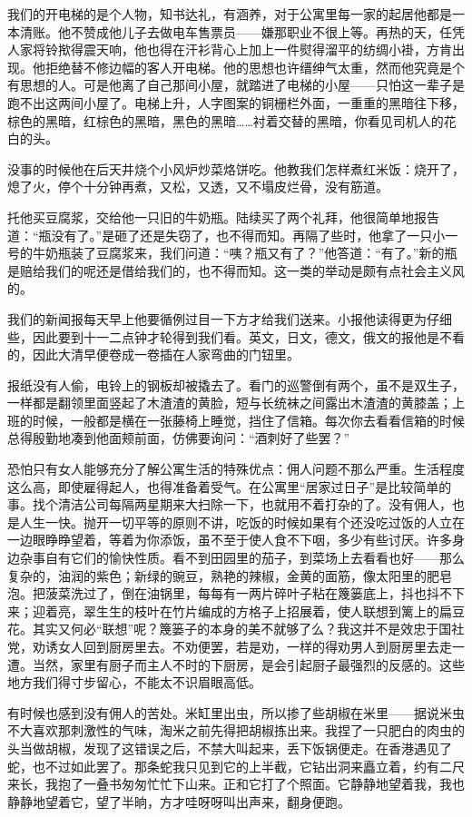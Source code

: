 \par 我们的开电梯的是个人物，知书达礼，有涵养，对于公寓里每一家的起居他都是一本清账。他不赞成他儿子去做电车售票员——嫌那职业不很上等。再热的天，任凭人家将铃揿得震天响，他也得在汗衫背心上加上一件熨得溜平的纺绸小褂，方肯出现。他拒绝替不修边幅的客人开电梯。他的思想也许缙绅气太重，然而他究竟是个有思想的人。可是他离了自己那间小屋，就踏进了电梯的小屋——只怕这一辈子是跑不出这两间小屋了。电梯上升，人字图案的铜栅栏外面，一重重的黑暗往下移，棕色的黑暗，红棕色的黑暗，黑色的黑暗……衬着交替的黑暗，你看见司机人的花白的头。
\par 没事的时候他在后天井烧个小风炉炒菜烙饼吃。他教我们怎样煮红米饭：烧开了，熄了火，停个十分钟再煮，又松，又透，又不塌皮烂骨，没有筋道。
\par 托他买豆腐浆，交给他一只旧的牛奶瓶。陆续买了两个礼拜，他很简单地报告道：“瓶没有了。”是砸了还是失窃了，也不得而知。再隔了些时，他拿了一只小一号的牛奶瓶装了豆腐浆来，我们问道：“咦？瓶又有了？”他答道：“有了。”新的瓶是赔给我们的呢还是借给我们的，也不得而知。这一类的举动是颇有点社会主义风的。
\par 我们的新闻报每天早上他要循例过目一下方才给我们送来。小报他读得更为仔细些，因此要到十一二点钟才轮得到我们看。英文，日文，德文，俄文的报他是不看的，因此大清早便卷成一卷插在人家弯曲的门钮里。
\par 报纸没有人偷，电铃上的钢板却被撬去了。看门的巡警倒有两个，虽不是双生子，一样都是翻领里面竖起了木渣渣的黄脸，短与长统袜之间露出木渣渣的黄膝盖；上班的时候，一般都是横在一张藤椅上睡觉，挡住了信箱。每次你去看看信箱的时候总得殷勤地凑到他面颊前面，仿佛要询问：“酒刺好了些罢？”
\par 恐怕只有女人能够充分了解公寓生活的特殊优点：佣人问题不那么严重。生活程度这么高，即使雇得起人，也得准备着受气。在公寓里“居家过日子”是比较简单的事。找个清洁公司每隔两星期来大扫除一下，也就用不着打杂的了。没有佣人，也是人生一快。抛开一切平等的原则不讲，吃饭的时候如果有个还没吃过饭的人立在一边眼睁睁望着，等着为你添饭，虽不至于使人食不下咽，多少有些讨厌。许多身边杂事自有它们的愉快性质。看不到田园里的茄子，到菜场上去看看也好——那么复杂的，油润的紫色；新绿的豌豆，熟艳的辣椒，金黄的面筋，像太阳里的肥皂泡。把菠菜洗过了，倒在油锅里，每每有一两片碎叶子粘在篾篓底上，抖也抖不下来；迎着亮，翠生生的枝叶在竹片编成的方格子上招展着，使人联想到篱上的扁豆花。其实又何必“联想”呢？篾篓子的本身的美不就够了么？我这并不是效忠于国社党，劝诱女人回到厨房里去。不劝便罢，若是劝，一样的得劝男人到厨房里去走一遭。当然，家里有厨子而主人不时的下厨房，是会引起厨子最强烈的反感的。这些地方我们得寸步留心，不能太不识眉眼高低。
\par 有时候也感到没有佣人的苦处。米缸里出虫，所以掺了些胡椒在米里——据说米虫不大喜欢那刺激性的气味，淘米之前先得把胡椒拣出来。我捏了一只肥白的肉虫的头当做胡椒，发现了这错误之后，不禁大叫起来，丢下饭锅便走。在香港遇见了蛇，也不过如此罢了。那条蛇我只见到它的上半截，它钻出洞来矗立着，约有二尺来长，我抱了一叠书匆匆忙忙下山来。正和它打了个照面。它静静地望着我，我也静静地望着它，望了半晌，方才哇呀呀叫出声来，翻身便跑。
